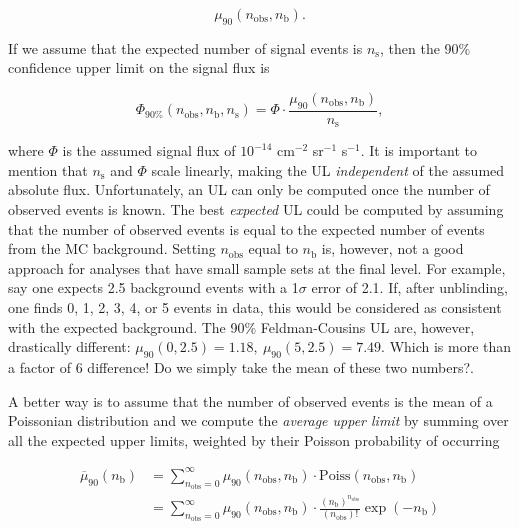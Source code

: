 \begin{equation}
\mu_{90} \left(n_\textrm{obs},n_\textrm{b}\right).
\end{equation}

\noindent If we assume that the expected number of signal events is $n_\textrm{s}$, then the 90\% confidence upper limit on the signal flux is

\begin{equation}
\label{eq:flux}
\Phi_{90\%}\left(n_\textrm{obs},n_\textrm{b},n_\textrm{s}\right) = \Phi \cdot  \frac{\mu_{90}\left(n_\textrm{obs},n_\textrm{b}\right)}{n_\textrm{s}},
\end{equation}

\noindent where $\Phi$ is the assumed signal flux of $10^{-14}$ cm$^{-2}$ sr$^{-1}$ s$^{-1}$. It is important to mention that $n_\textrm{s}$ and $\Phi$ scale linearly, making the UL \textit{independent} of the assumed absolute flux. Unfortunately, an UL can only be computed once the number of observed events is known. The best \textit{expected} UL could be computed by assuming that the number of observed events is equal to the expected number of events from the MC background. Setting $n_\textrm{obs}$ equal to $n_\textrm{b}$ is, however, not a good approach for analyses that have small sample sets at the final level. For example, say one expects 2.5 background events with a 1$\sigma$ error of 2.1. If, after unblinding, one finds 0, 1, 2, 3, 4, or 5 events in data, this would be considered as consistent with the expected background. The 90\% Feldman-Cousins UL are, however, drastically different: $\mu_{90}(0,2.5) = 1.18, \ \mu_{90}(5,2.5) = 7.49$. Which is more than a factor of 6 difference! Do we simply take the mean of these two numbers?.

A better way is to assume that the number of observed events is the mean of a Poissonian distribution and we compute the \textit{average upper limit} by summing over all the expected upper limits, weighted by their Poisson probability of occurring \cite{Hill:2002nv}

\begin{equation}
\begin{split}
\overline{\mu}_{90}(n_\textrm{b}) &= \sum^{\infty}_{n_\textrm{obs}=0} \mu_{90}\left(n_\textrm{obs},n_\textrm{b}\right) \cdot \textrm{Poiss}\left(n_\textrm{obs},n_\textrm{b}\right)\\
&= \sum^{\infty}_{n_\textrm{obs}=0} \mu_{90}\left(n_\textrm{obs},n_\textrm{b}\right) \cdot \frac{\left(n_\textrm{b}\right)^{n_\textrm{obs}}}{\left(n_\textrm{obs}\right)!} \exp\left(-n_\textrm{b}\right)
\end{split}
\end{equation}

